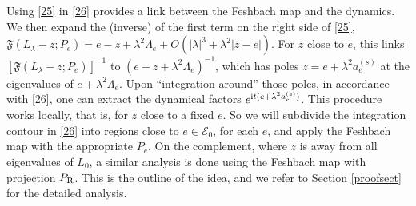 \documentclass[letterpaper,onecolumn,11pt,accepted=2021-12-09]{quantumarticle}
\numberwithin{equation}{section}
\renewcommand{\r}{{\rm R}}
\renewcommand{\i}{{\rm i}}
\begin{document}
Using \eqref{25} in \eqref{26} provides a link between the Feshbach map and the dynamics. We then expand the (inverse) of the first term on the right side of \eqref{25}, ${\mathfrak F}(L_\lambda-z;P_e) = e-z+\lambda^2 \Lambda_e +O(|\lambda|^3 +\lambda^2|z-e|)$. For $z$ close to $e$, this links  $[{\mathfrak F}(L_\lambda-z;P_e)]^{-1}$ to $(e-z+\lambda^2\Lambda_e)^{-1}$, which has poles $z=e+\lambda^2 a_e^{(s)}$ at the eigenvalues of $e+\lambda^2\Lambda_e$. Upon ``integration around'' those poles, in accordance with \eqref{26}, one can extract the dynamical factors $e^{\i t (e+\lambda^2 a_e^{(s)})}$. This procedure works locally, that is, for $z$ close to a fixed $e$. So we will subdivide the integration contour in \eqref{26} into regions close to $e\in{\mathcal E}_0$, for each $e$, and apply the Feshbach map with the appropriate $P_e$. On the complement, where $z$ is away from all eigenvalues of $L_0$, a similar analysis is done using the Feshbach map with projection $P_\r$. This is the outline of the idea, and we refer to Section \ref{proofsect} for the detailed analysis. 

\bigskip
\end{document}
